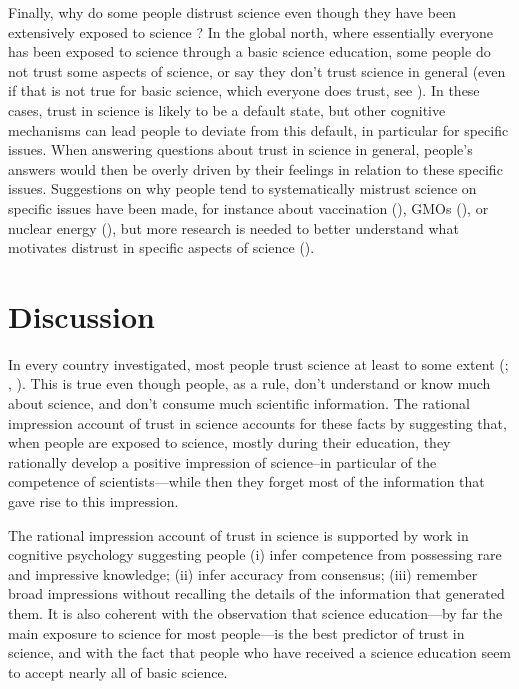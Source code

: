 \documentclass[
  jou,
  floatsintext,
  longtable,
  nolmodern,
  notxfonts,
  notimes,
  colorlinks=true,linkcolor=blue,citecolor=blue,urlcolor=blue]{apa7}
\begin{document}
Finally, why do some people distrust science even though they have been
extensively exposed to science ? In the global north, where essentially
everyone has been exposed to science through a basic science education,
some people do not trust some aspects of science, or say they don't
trust science in general (even if that is not true for basic science,
which everyone does trust, see
). In these cases, trust in science is likely to
be a default state, but other cognitive mechanisms can lead people to
deviate from this default, in particular for specific issues. When
answering questions about trust in science in general, people's answers
would then be overly driven by their feelings in relation to these
specific issues. Suggestions on why people tend to systematically
mistrust science on specific issues have been made, for instance about
vaccination
(), GMOs
(), or nuclear energy
(), but more research is needed to better understand what motivates
distrust in specific aspects of science
().

\section{Discussion}\label{discussion}

In every country investigated, most people trust science at least to
some extent (;
,
).
This is true even though people, as a rule, don't understand or know
much about science, and don't consume much scientific information. The
rational impression account of trust in science accounts for these facts
by suggesting that, when people are exposed to science, mostly during
their education, they rationally develop a positive impression of
science--in particular of the competence of scientists---while then they
forget most of the information that gave rise to this impression.

The rational impression account of trust in science is supported by work
in cognitive psychology suggesting people (i) infer competence from
possessing rare and impressive knowledge; (ii) infer accuracy from
consensus; (iii) remember broad impressions without recalling the
details of the information that generated them. It is also coherent with
the observation that science education---by far the main exposure to
science for most people---is the best predictor of trust in science, and
with the fact that people who have received a science education seem to
accept nearly all of basic science.
\end{document}
